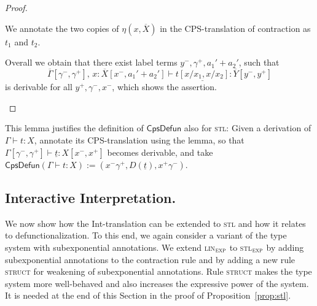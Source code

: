 \documentclass{LMCS}
\theoremstyle{definition}
\theoremstyle{plain}
\newcommand{\kw}[1]{\mathsf{#1}}
\newcommand{\I}[2]{#1 \colon #2}
\newcommand{\R}[1]{\textsc{#1}}
\newcommand{\SeqTm}[3]{#1 \vdash #2 \colon #3}
\newcommand{\cps}[1]{\underline{#1}}
\newcommand{\linexp}{\textsc{lin}$_\textsc{exp}$\xspace}
\newcommand{\stlexp}{\textsc{stl}$_\textsc{exp}$\xspace}
\begin{document}
\begin{proof}
\begin{itemize}
      We annotate the two copies of $\eta(x, \overline X)$
      in the CPS-translation of contraction as $t_1$ and $t_2$.

      Overall we obtain that there exist label terms $y^-, \gamma^+,
      a_1'+a_2'$, such that 
      \[
        \SeqTm{\overline \Gamma[\gamma^-,\gamma^+],\,
        \I {x} {\overline X[x^-, a_1' + a_2']}}
        {\cps{t[x/x_1,x/x_2]}}{\overline Y[y^-, y^+]}
      \]
      is derivable for all $y^+, \gamma^-, x^-$, 
      which shows the assertion.\qedhere
  \end{itemize}
\end{proof}

\noindent This lemma justifies the definition of $\kw{CpsDefun}$ also
for \textsc{stl}: Given a derivation of $\SeqTm{\Gamma}{t}{X}$,
annotate its CPS-translation using the lemma, so that
$\SeqTm{\Gamma[\gamma^-, \gamma^+]}{\cps t}{X[x^-,x^+]}$
becomes derivable, and take
$\kw{CpsDefun}(\SeqTm{\Gamma}{t}{X}) 
:=(x^-\gamma^+, D(\cps t), x^+\gamma^-)$.

\subsection{Interactive Interpretation.}
We now show how the Int-translation can be extended to
\textsc{stl} and how it relates to defunctionalization.
To this end, we again consider a variant of the type system with 
subexponential annotations.
We extend \linexp to \stlexp 
by adding subexponential annotations to the contraction rule
and by adding a new rule \R{struct} for weakening of subexponential annotations.
Rule \R{struct} makes the type system more well-behaved and also
increases the expressive power of the system. It is needed 
at the end of this Section in the 
proof of Proposition~\ref{prop:stl}.
\end{document}
